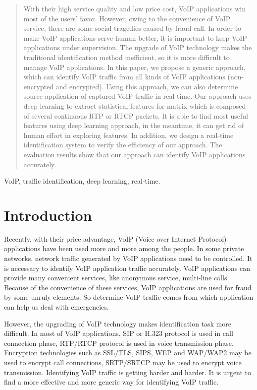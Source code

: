 \documentclass[conference]{IEEEtran}
\begin{document}
\begin{abstract}
  With their high service quality and low price cost, VoIP applications win most of the users' favor. However, owing to the convenience of VoIP service, there are some social tragedies caused by fraud call. In order to make VoIP applications serve human better, it is important to keep VoIP applications under supervision. The upgrade of VoIP technology makes the traditional identification method inefficient, so it is more difficult to manage VoIP applications. In this paper, we propose a generic approach, which can identify VoIP traffic from all kinds of VoIP applications (non-encrypted and encrypted). Using this approach, we can also determine source application of captured VoIP traffic in real time. Our approach uses deep learning to extract statistical features for matrix which is composed of several continuous RTP or RTCP packets. It is able to find most useful features using deep learning approach, in the meantime, it can get rid of human effort in exploring features. In addition, we design a real-time identification system to verify the efficiency of our approach. The evaluation results show that our approach can identify VoIP applications accurately.
\end{abstract}

\begin{IEEEkeywords}
VoIP, traffic identification, deep learning, real-time.
\end{IEEEkeywords}

\section{Introduction}
\label{intro}
Recently, with their price advantage, VoIP (Voice over Internet Protocol) applications have been used more and more among the people. In some private networks, network traffic generated by VoIP applications need to be controlled. It is necessary to identify VoIP application traffic accurately. VoIP applications can provide many convenient services, like anonymous service, multi-line calls. Because of the convenience of these services, VoIP applications are used for fraud by some unruly elements. So determine VoIP traffic comes from which application can help us deal with emergencies.

However, the upgrading of VoIP technology makes identification task more difficult. In most of VoIP applications, SIP or H.323 protocol is used in call connection phase, RTP/RTCP protocol is used in voice transmission phase. Encryption technologies such as SSL/TLS, SIPS, WEP and WAP/WAP2 may be used to encrypt call connections, SRTP/SRTCP may be used to encrypt voice transmission. Identifying VoIP traffic is getting harder and harder. It is urgent to find a more effective and more generic way for identifying VoIP traffic.
\end{document}
